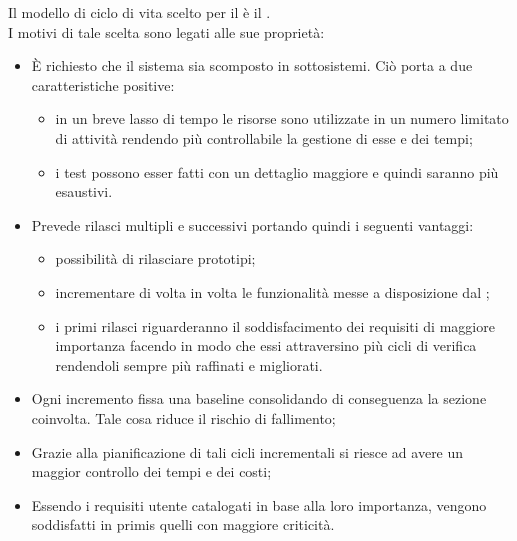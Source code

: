 		Il modello di ciclo di vita scelto per il  è il \underline{}.\\
		I motivi di tale scelta sono legati alle sue proprietà:
		\begin{itemize}
			\item È richiesto che il sistema sia scomposto in sottosistemi. Ciò porta a due caratteristiche positive:
			\begin{itemize}
				\item in un breve lasso di tempo le risorse sono utilizzate in un numero limitato di attività rendendo più controllabile la gestione di esse e dei tempi;
				\item i test possono esser fatti con un dettaglio maggiore e quindi saranno più esaustivi.
			\end{itemize}
			\item Prevede rilasci multipli e successivi portando quindi i seguenti vantaggi:
			\begin{itemize}
				\item possibilità di rilasciare prototipi;
				\item incrementare di volta in volta le funzionalità messe a disposizione dal ;
				\item i primi rilasci riguarderanno il soddisfacimento dei requisiti di maggiore importanza facendo in modo che essi attraversino più cicli di verifica rendendoli sempre più raffinati e migliorati.
			\end{itemize}
			\item Ogni incremento fissa una baseline consolidando di conseguenza la sezione coinvolta. Tale cosa riduce il rischio di fallimento;
			\item Grazie alla pianificazione di tali cicli incrementali si riesce ad avere un maggior controllo dei tempi e dei costi;
			\item Essendo i requisiti utente catalogati in base alla loro importanza, vengono soddisfatti in primis quelli con maggiore criticità.
		\end{itemize}